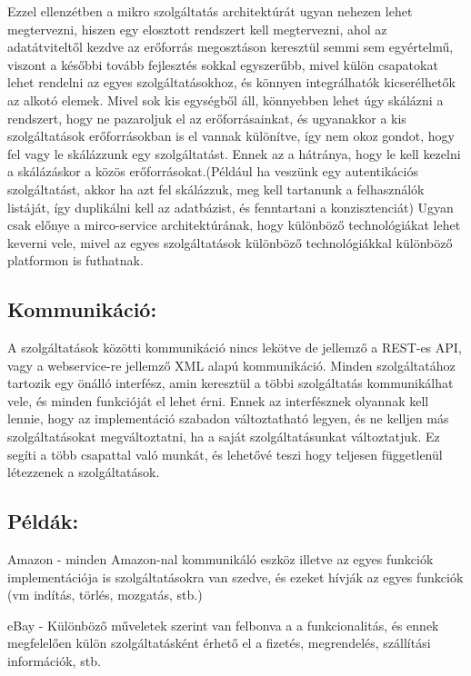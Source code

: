 \documentclass[11pt,magyar,a4paper,oneside,]{report}
\begin{document}
Ezzel ellenzétben a mikro szolgáltatás architektúrát ugyan nehezen lehet
megtervezni, hiszen egy elosztott rendszert kell megtervezni, ahol az
adatátviteltől kezdve az erőforrás megosztáson keresztül semmi sem
egyértelmű, viszont a későbbi tovább fejlesztés sokkal egyszerűbb, mivel
külön csapatokat lehet rendelni az egyes szolgáltatásokhoz, és könnyen
integrálhatók kicserélhetők az alkotó elemek. Mivel sok kis egységből
áll, könnyebben lehet úgy skálázni a rendszert, hogy ne pazaroljuk el az
erőforrásainkat, és ugyanakkor a kis szolgáltatások erőforrásokban is el
vannak különítve, így nem okoz gondot, hogy fel vagy le skálázzunk egy
szolgáltatást. Ennek az a hátránya, hogy le kell kezelni a skálázáskor a
közös erőforrásokat.(Például ha veszünk egy autentikációs szolgáltatást,
akkor ha azt fel skálázzuk, meg kell tartanunk a felhasználók listáját,
így duplikálni kell az adatbázist, és fenntartani a konzisztenciát)
Ugyan csak előnye a mirco-service architektúrának, hogy különböző
technológiákat lehet keverni vele, mivel az egyes szolgáltatások
különböző technológiákkal különböző platformon is futhatnak.

\subsection{Kommunikáció:}\label{kommunikuxe1ciuxf3}

A szolgáltatások közötti kommunikáció nincs lekötve de jellemző a
REST-es API, vagy a webservice-re jellemző XML alapú kommunikáció.
Minden szolgáltatához tartozik egy önálló interfész, amin keresztül a
többi szolgáltatás kommunikálhat vele, és minden funkcióját el lehet
érni. Ennek az interfésznek olyannak kell lennie, hogy az implementáció
szabadon változtatható legyen, és ne kelljen más szolgáltatásokat
megváltoztatni, ha a saját szolgáltatásunkat változtatjuk. Ez segíti a
több csapattal való munkát, és lehetővé teszi hogy teljesen függetlenül
létezzenek a szolgáltatások.

\subsection{Példák:}\label{puxe9lduxe1k}

Amazon - minden Amazon-nal kommunikáló eszköz illetve az egyes funkciók
implementációja is szolgáltatásokra van szedve, és ezeket hívják az
egyes funkciók (vm indítás, törlés, mozgatás, stb.)

eBay - Különböző műveletek szerint van felbonva a a funkcionalitás, és
ennek megfelelően külön szolgáltatásként érhető el a fizetés,
megrendelés, szállítási információk, stb.
\end{document}
